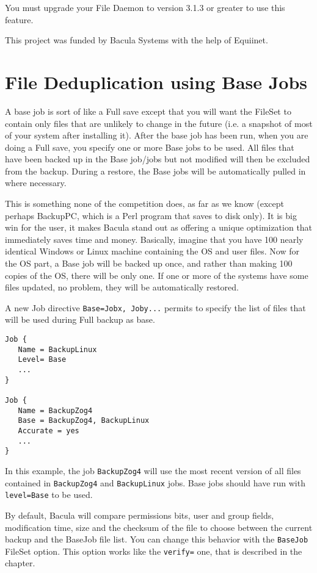 You must upgrade your File Daemon to version 3.1.3 or greater to use this
feature.

This project was funded by Bacula Systems with the help of Equiinet.

\section{File Deduplication using Base Jobs}
A base job is sort of like a Full save except that you will want the FileSet to
contain only files that are unlikely to change in the future (i.e.  a snapshot
of most of your system after installing it).  After the base job has been run,
when you are doing a Full save, you specify one or more Base jobs to be used.
All files that have been backed up in the Base job/jobs but not modified will
then be excluded from the backup.  During a restore, the Base jobs will be
automatically pulled in where necessary.

This is something none of the competition does, as far as we know (except
perhaps BackupPC, which is a Perl program that saves to disk only).  It is big
win for the user, it makes Bacula stand out as offering a unique optimization
that immediately saves time and money.  Basically, imagine that you have 100
nearly identical Windows or Linux machine containing the OS and user files.
Now for the OS part, a Base job will be backed up once, and rather than making
100 copies of the OS, there will be only one.  If one or more of the systems
have some files updated, no problem, they will be automatically restored.

A new Job directive \texttt{Base=Jobx, Joby...} permits to specify the list of
files that will be used during Full backup as base.

\begin{verbatim}
Job {
   Name = BackupLinux
   Level= Base
   ...
}

Job {
   Name = BackupZog4
   Base = BackupZog4, BackupLinux
   Accurate = yes
   ...
}
\end{verbatim}

In this example, the job \texttt{BackupZog4} will use the most recent version
of all files contained in \texttt{BackupZog4} and \texttt{BackupLinux}
jobs. Base jobs should have run with \texttt{level=Base} to be used.

By default, Bacula will compare permissions bits, user and group fields,
modification time, size and the checksum of the file to choose between the
current backup and the BaseJob file list. You can change this behavior with the
\texttt{BaseJob} FileSet option. This option works like the \texttt{verify=}
one, that is described in the  chapter.

